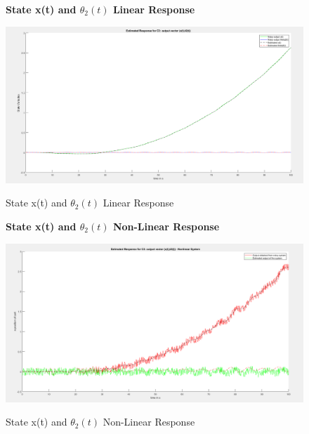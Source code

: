 \documentclass[12pt]{article}
\begin{document}
\begin{figure}[H]
    \centering
    \textbf{State x(t) and $\theta_2(t)$ Linear Response}\par\medskip
    \includegraphics[scale = 0.35]{StateXth2LinearResponse.png}\\[0.0 cm]	%
    \caption{State x(t) and $\theta_2(t)$ Linear Response} 
\end{figure}

\begin{figure}[H]
    \centering
    \textbf{State x(t) and $\theta_2(t)$ Non-Linear Response}\par\medskip
    \includegraphics[scale = 0.35]{StateXth2NonLinearResponse.png}\\[0.0 cm]	%
    \caption{State x(t) and $\theta_2(t)$ Non-Linear Response} 
\end{figure}
\end{document}
